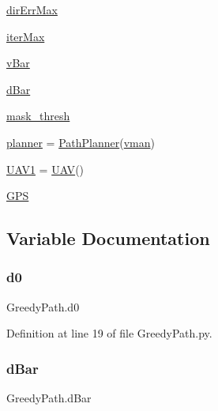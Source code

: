 \begin{DoxyCompactItemize}
\item 
\mbox{\hyperlink{namespace_greedy_path_a8ea64d8438aecf56abe3d63433b8a3ea}{dir\+Err\+Max}}
\item 
\mbox{\hyperlink{namespace_greedy_path_a5b46b8310be6f398493f6f89ea93c90f}{iter\+Max}}
\item 
\mbox{\hyperlink{namespace_greedy_path_a03451064d5350073da9cb253f7684576}{v\+Bar}}
\item 
\mbox{\hyperlink{namespace_greedy_path_a2dca3109ed198652e8fccb34ec8cf5cc}{d\+Bar}}
\item 
\mbox{\hyperlink{namespace_greedy_path_af051f6869eb924b58f0d44acbe2cd0a4}{mask\+\_\+thresh}}
\item 
\mbox{\hyperlink{namespace_greedy_path_a48d2bf39a0cc9f5e87640f060e67bd1c}{planner}} = \mbox{\hyperlink{classpath_plan_1_1_path_planner}{Path\+Planner}}(\mbox{\hyperlink{namespace_greedy_path_a0b686e13d9e46e185e611dc0b5d92e8f}{vman}})
\item 
\mbox{\hyperlink{namespace_greedy_path_a133ae9f113d9f694f9506cb6bad87f91}{U\+A\+V1}} = \mbox{\hyperlink{classpath_plan_1_1_u_a_v}{U\+AV}}()
\item 
\mbox{\hyperlink{namespace_greedy_path_a789d06703c87f9f5dca025c8695a1857}{G\+PS}}
\end{DoxyCompactItemize}


\subsection{Variable Documentation}
\mbox{\label{namespace_greedy_path_a3dd8a5c17eb3ef664131b4d0070b61f8}} 
\subsubsection{\texorpdfstring{d0}{d0}}
{\footnotesize\ttfamily Greedy\+Path.\+d0}



Definition at line 19 of file Greedy\+Path.\+py.

\mbox{\label{namespace_greedy_path_a2dca3109ed198652e8fccb34ec8cf5cc}} 
\subsubsection{\texorpdfstring{d\+Bar}{dBar}}
{\footnotesize\ttfamily Greedy\+Path.\+d\+Bar}



